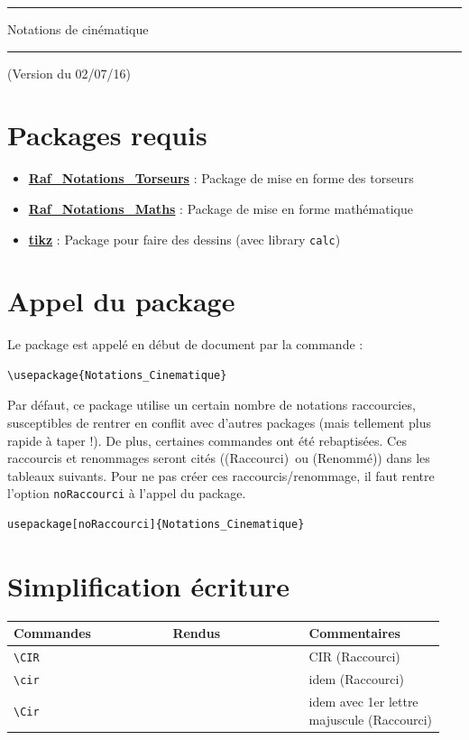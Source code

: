 \documentclass[a4paper,10pt]{article}
\newcommand{\rac}{({\color{red}Raccourci})}
\newcommand{\ren}{({\color{blue}Renommé})}
\begin{document}
	\begin{center}
		\hrule{\Large Notations de cinématique}\\\hrule
	\end{center}

	(Version du 02/07/16)

	\section{Packages requis}

		\begin{itemize}
			\item \href{http://enseignement.allais.eu/page-latex}{\textbf{Raf\_Notations\_Torseurs}} : Package de mise en forme des torseurs
			\item \href{http://enseignement.allais.eu/page-latex}{\textbf{Raf\_Notations\_Maths}} : Package de mise en forme mathématique
			\item \href{http://www.ctan.org/pkg/pgf}{\textbf{tikz}} : Package pour faire des dessins (avec library \verb!calc!)
		\end{itemize}

	\section{Appel du package}

		Le package est appelé en début de document par la commande :
		\begin{verbatim}
\usepackage{Notations_Cinematique}
		\end{verbatim}

	Par défaut, ce package utilise un certain nombre de notations raccourcies, susceptibles de rentrer en conflit avec d'autres packages (mais tellement plus rapide à taper !).
	De plus, certaines commandes ont été rebaptisées.
	Ces raccourcis et renommages seront cités (\rac\ ou \ren) dans les tableaux suivants.
	Pour ne pas créer ces raccourcis/renommage, il faut rentre l'option \verb!noRaccourci! à l'appel du package.

	\begin{verbatim}
usepackage[noRaccourci]{Notations_Cinematique}
	\end{verbatim}


	\section{Simplification écriture}
	\noindent
	\begin{tabular}{|p{0.35\linewidth}|p{0.3\linewidth}|p{0.3\linewidth}|}
		\hline
			\textbf{Commandes}&\textbf{Rendus}&\textbf{Commentaires}
		\\\hline\hline
			\verb!\CIR!			&	\CIR			&	CIR \rac
		\\\hline
			\verb!\cir!		&	\cir		&	idem \rac
		\\\hline
			\verb!\Cir!			&	\Cir			&	idem avec 1er lettre majuscule \rac
		\\\hline
	\end{tabular}
\end{document}
